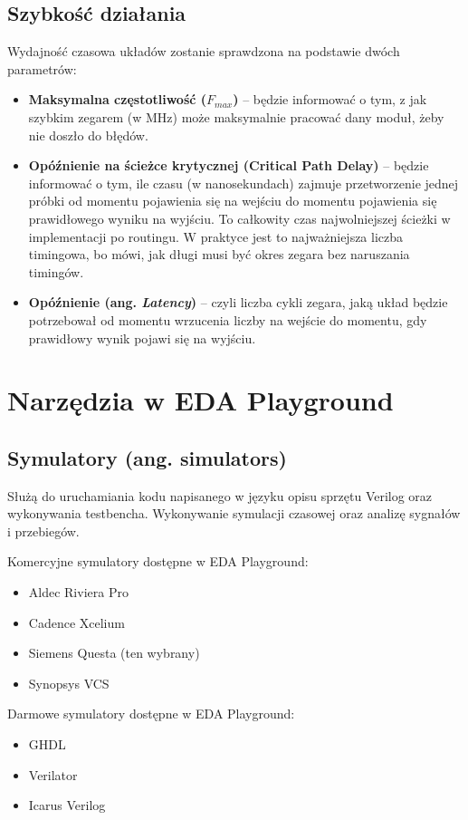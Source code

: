 \documentclass[12pt, a4paper, oneside]{scrreprt}
\begin{document}
\subsection{Szybkość działania}
Wydajność czasowa układów zostanie sprawdzona na podstawie dwóch parametrów:
\begin{itemize}
    \item \textbf{Maksymalna częstotliwość ($F_{max}$)} -- będzie informować o tym, z jak szybkim zegarem (w MHz) może maksymalnie pracować dany moduł, żeby nie doszło do błędów.
    \item \textbf{Opóźnienie na ścieżce krytycznej (Critical Path Delay)} -- będzie informować o tym, ile czasu (w nanosekundach) zajmuje przetworzenie jednej próbki od momentu pojawienia się na wejściu do momentu pojawienia się prawidłowego wyniku na wyjściu.
    To całkowity czas najwolniejszej ścieżki w implementacji po routingu. W praktyce jest to najważniejsza liczba timingowa, bo mówi, jak długi musi być okres zegara bez naruszania timingów.
    \item \textbf{Opóźnienie (ang. \textit{Latency})} -- czyli liczba cykli zegara, jaką układ będzie potrzebował od momentu wrzucenia liczby na wejście do momentu, gdy prawidłowy wynik pojawi się na wyjściu.
\end{itemize}

\section{Narzędzia w EDA Playground}

\subsection{Symulatory (ang. simulators)}
Służą do uruchamiania kodu napisanego w języku opisu sprzętu Verilog oraz wykonywania testbencha.
Wykonywanie symulacji czasowej oraz analizę sygnałów i przebiegów.


Komercyjne symulatory dostępne w EDA Playground:
\begin{itemize}
    \item Aldec Riviera Pro
    \item Cadence Xcelium
    \item Siemens Questa (ten wybrany)
    \item Synopsys VCS
\end{itemize}

Darmowe symulatory dostępne w EDA Playground:
\begin{itemize}
    \item GHDL
    \item Verilator
    \item Icarus Verilog
\end{itemize}
\end{document}
